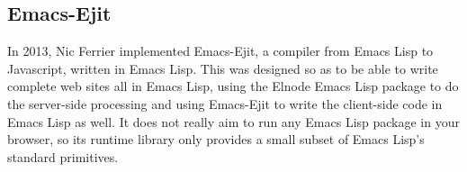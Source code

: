 \documentclass[format=acmsmall, review]{acmart}
\newcommand \Elisp {Emacs Lisp}
\begin{document}

\subsection{Emacs-Ejit}

In 2013, Nic Ferrier implemented Emacs-Ejit, a compiler from \Elisp{} to
Javascript, written in \Elisp{}.  This was designed so as to be able to write complete web sites
all in \Elisp{}, using the Elnode \Elisp{} package to do the server-side
processing and using Emacs-Ejit to write the client-side code in \Elisp{}
as well.  It does not really aim to run any \Elisp{} package in your
browser, so its runtime library only provides a small subset of \Elisp's
standard primitives.




\end{document}
